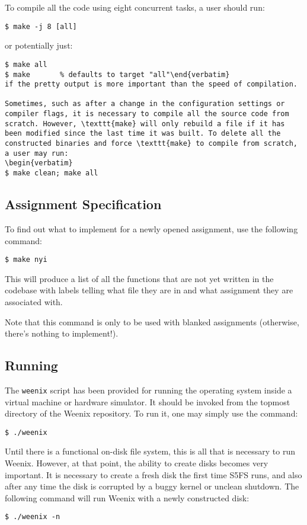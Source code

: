 To compile all the code using eight concurrent tasks, a user should run:
\begin{verbatim}
$ make -j 8 [all]\end{verbatim}
or potentially just:
\begin{verbatim}
$ make all
$ make       % defaults to target "all"\end{verbatim}
if the pretty output is more important than the speed of compilation.

Sometimes, such as after a change in the configuration settings or compiler flags, it is necessary to compile all the source code from scratch. However, \texttt{make} will only rebuild a file if it has been modified since the last time it was built. To delete all the constructed binaries and force \texttt{make} to compile from scratch, a user may run:
\begin{verbatim}
$ make clean; make all\end{verbatim}

\subsection{Assignment Specification}
To find out what to implement for a newly opened assignment, use the following command:
\begin{verbatim}
$ make nyi\end{verbatim}
This will produce a list of all the functions that are not yet written in the codebase with labels telling what file they are in and what assignment they are associated with.

Note that this command is only to be used with blanked assignments (otherwise, there's nothing to implement!).

\subsection{Running}
The \texttt{weenix} script has been provided for running the operating system inside a virtual machine or hardware simulator. It should be invoked from the topmost directory of the Weenix repository. To run it, one may simply use the command:
\begin{verbatim}
$ ./weenix\end{verbatim}

Until there is a functional on-disk file system, this is all that is necessary to run Weenix. However, at that point, the ability to create disks becomes very important. It is necessary to create a fresh disk the first time S5FS runs, and also after any time the disk is corrupted by a buggy kernel or unclean shutdown. The following command will run Weenix with a newly constructed disk:
\begin{verbatim}
$ ./weenix -n\end{verbatim}

